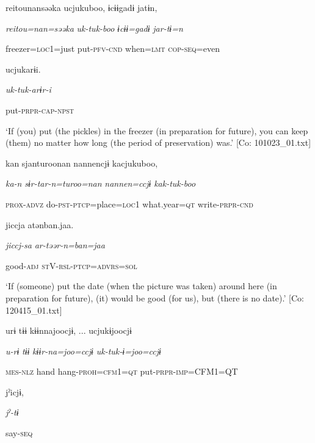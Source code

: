 \ea\label{ex:8-142}
\ea [= (\ref{ex:8-44}a)]

    {\TM}
\glll  {\textbar}reitou{\textbar}nansəəka  ucjukuboo,  ɨcɨɨgadɨ  jatɨn,

      \textit{reitou=nan=səəka}  \textit{uk-tuk-boo}  \textit{ɨcɨɨ=gadɨ}  \textit{jar-tɨ=n}

      freezer=\textsc{loc}1=just  put-\textsc{pfv}-\textsc{cnd}  when=\textsc{lmt}  \textsc{cop}-\textsc{seq}=even

      ucjukarɨi.

      \textit{uk-tuk{}-arɨr-i}

      put-\textsc{prpr}-\textsc{cap}-\textsc{npst}

\glt ‘If (you) put (the pickles) in the freezer (in preparation for future), you can keep (them) no matter how long (the period of preservation) was.’ [Co: 101023\_01.txt]
\ex [= (\ref{ex:8-141}a)]

    {\TM}
\glll  kan  sjanturoonan  {\textbar}nannen{\textbar}cjɨ  kacjukuboo,

      \textit{ka-n}  \textit{sɨr-tar-n=turoo=nan}  \textit{nannen=ccjɨ}  \textit{kak-tuk{}-boo}

      \textsc{prox}-\textsc{advz}  do-\textsc{pst}-\textsc{ptcp}=place=\textsc{loc}1  what.year=\textsc{qt}  write-\textsc{prpr}-\textsc{cnd}

      jiccja  atənban.jaa.  

      \textit{jiccj-sa}  \textit{ar-təər-n=ban=jaa}  

      good-\textsc{adj}  \textsc{st}V-\textsc{rsl}-\textsc{ptcp}=\textsc{advrs}=\textsc{sol}

\glt ‘If (someone) put the date (when the picture was taken) around here (in preparation for future), (it) would be good (for us), but (there is no date).’ [Co: 120415\_01.txt]
\z


    {\TM}
\glll  urɨ  tɨɨ  kɨɨnnajoocjɨ, ...  ucjukɨjoocjɨ

      \textit{u-rɨ}  \textit{tɨɨ}  \textit{kɨɨr-na=joo=ccjɨ}  \textit{uk-tuk{}-ɨ=joo=ccjɨ}

      \textsc{mes}-\textsc{nlz}  hand  hang-\textsc{proh}=\textsc{cfm1}=\textsc{qt}  put-\textsc{prpr}-\textsc{imp}=CFM1=QT

      jˀicjɨ,      

      \textit{jˀ-tɨ}      

      say-\textsc{seq}

